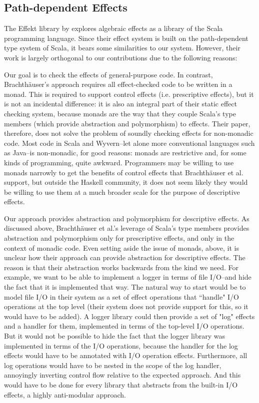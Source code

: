\subsection{Path-dependent Effects}
The Effekt library by \citet{brachthauser20} explores algebraic effects as a library of the Scala programming language. Since their effect system is built on the path-dependent type system of Scala, it bears some similarities to our system. However, their work is largely orthogonal to our contributions due to the following reasons: 

	 Our goal is to check the effects of general-purpose code. In contrast, Brachthäuser's approach requires all effect-checked code to be written in a monad. This is required to support control effects (i.e. prescriptive effects), but it is not an incidental difference: it is also an integral part of their static effect checking system, because monads are the way that they couple Scala's type members (which provide abstraction and polymorphism) to effects. Their paper, therefore, does not solve the problem of soundly checking effects for non-monadic code. Most code in Scala and Wyvern--let alone more conventional languages such as Java--is non-monadic, for good reasons: monads are restrictive and, for some kinds of programming, quite awkward. Programmers may be willing to use monads narrowly to get the benefits of control effects that Brachthäuser et al. support, but outside the Haskell community, it does not seem likely they would be willing to use them at a much broader scale for the purpose of descriptive effects.
	 
   Our approach provides abstraction and polymorphism for descriptive effects. As discussed above, Brachthäuser et al.'s leverage of Scala's type members provides abstraction and polymorphism only for prescriptive effects, and only in the context of monadic code. Even setting aside the issue of monads, above, it is unclear how their approach can provide abstraction for descriptive effects. The reason is that their abstraction works backwards from the kind we need. For example, we want to be able to implement a logger in terms of file I/O--and hide the fact that it is implemented that way. The natural way to start would be to model file I/O in their system as a set of effect operations that ``handle" I/O operations at the top level (their system does not provide support for this, so it would have to be added). A logger library could then provide a set of "log" effects and a handler for them, implemented in terms of the top-level I/O operations. But it would not be possible to hide the fact that the logger library was implemented in terms of the I/O operations, because the handler for the log effects would have to be annotated with I/O operation effects. Furthermore, all log operations would have to be nested in the scope of the log handler, annoyingly inverting control flow relative to the expected approach. And this would have to be done for every library that abstracts from the built-in I/O effects, a highly anti-modular approach.
	



